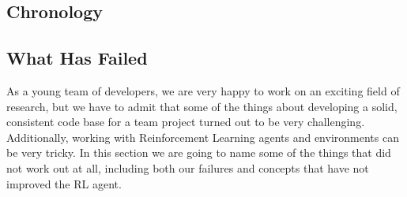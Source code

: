 \documentclass{article}
\begin{document}
\subsection{Chronology}
\subsection{What Has Failed}
As a young team of developers, we are very happy to work on an exciting field of research, but we have to admit that some of the things about developing a solid, consistent code base for a team project turned out to be very challenging. Additionally, working with Reinforcement Learning agents and environments can be very tricky. In this section we are going to name some of the things that did not work out at all, including both our failures and concepts that have not improved the RL agent. 
\end{document}
